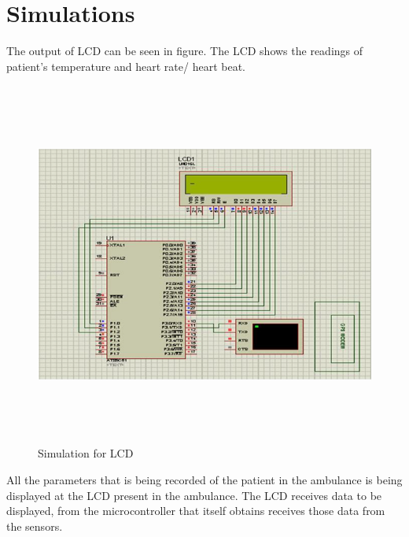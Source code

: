 \documentclass[12pt,a4paper,oneside,openright]{report}
\begin{document}
\section{Simulations}
The output of LCD can be seen in figure. The LCD shows the readings of patient’s temperature and heart rate/ heart beat.
\begin{figure}[!h]
 \centering
 \includegraphics[width =\textwidth,height=12cm]{Figures/27.jpg}
 \caption{Simulation for LCD}
 \label{Simulation for LCD}
\end{figure}

All the parameters that is being recorded of the patient in the ambulance is being displayed at the LCD present in the ambulance. The LCD receives data to be displayed, from the microcontroller that itself obtains receives those data from the sensors.
\end{document}
